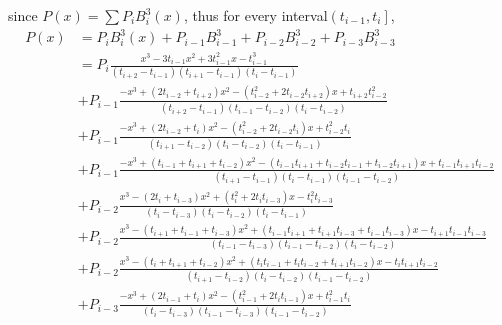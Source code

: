\documentclass[]{article}
\begin{document}
since $\displaystyle P(x) = \sum P_iB_i^3(x) $, thus for every interval$\displaystyle\left(t_{i-1},t_i\right]$,
\begin{align*}
	P(x) &= P_iB_i^3(x) + P_{i-1}B_{i-1}^3 + P_{i-2}B_{i-2}^3 + P_{i-3}B_{i-3}^3 \\
	&= P_i\frac{x^3 - 3t_{i-1}x^2 + 3t_{i-1}^2x - t_{i-1}^3}  {(t_{i+2} - t_{i-1})(t_{i+1} - t_{i-1})(t_i - t_{i-1})} \\
	&+ P_{i-1}\frac{-x^3 + (2t_{i-2}+t_{i+2})x^2 - (t_{i-2}^2+2t_{i-2}t_{i+2})x + t_{i+2}t_{i-2}^2}  {(t_{i+2} - t_{i-1})(t_{i-1} - t_{i-2})(t_i - t_{i-2})} \\
	&+ P_{i-1}\frac{-x^3 + (2t_{i-2}+t_i)x^2 - (t_{i-2}^2+2t_{i-2}t_i)x + t_{i-2}^2t_i}  {(t_{i+1} - t_{i-2})(t_i - t_{i-2})(t_i-t_{i-1})} \\
	&+ P_{i-1}\frac{-x^3 + (t_{i-1}+t_{i+1}+t_{i-2})x^2 - (t_{i-1}t_{i+1}+t_{i-2}t_{i-1}+t_{i-2}t_{i+1})x+t_{i-1}t_{i+1}t_{i-2}}  {(t_{i+1}-t_{i-1})(t_i-t_{i-1})(t_{i-1}-t_{i-2})} \\
	&+ P_{i-2}\frac{x^3 - (2t_i+t_{i-3})x^2 + (t_i^2+2t_it_{i-3})x - t_i^2t_{i-3}}  {(t_i-t_{i-3})(t_i-t_{i-2})(t_i-t_{i-1})} \\
	&+ P_{i-2}\frac{x^3 - (t_{i+1}+t_{i-1}+t_{i-3})x^2 + (t_{i-1}t_{i+1}+t_{i+1}t_{i-3}+t_{i-1}t_{i-3})x - t_{i+1}t_{i-1}t_{i-3}}  {(t_{i-1}-t_{i-3})(t_{i-1}-t_{i-2})(t_i-t_{i-2})} \\
	&+ P_{i-2}\frac{x^3 - (t_i+t_{i+1}+t_{i-2})x^2 + (t_it_{i-1}+t_it_{i-2}+t_{i+1}t_{i-2})x - t_it_{i+1}t_{i-2}}  {(t_{i+1}-t_{i-2})(t_i-t_{i-2})(t_{i-1}-t_{i-2})} \\
	&+ P_{i-3}\frac{-x^3 + (2t_{i-1}+t_i)x^2 - (t_{i-1}^2+2t_it_{i-1})x + t_{i-1}^2t_i}  {(t_i-t_{i-3})(t_{i-1}-t_{i-3})(t_{i-1}-t_{i-2})}
\end{align*}
\end{document}
